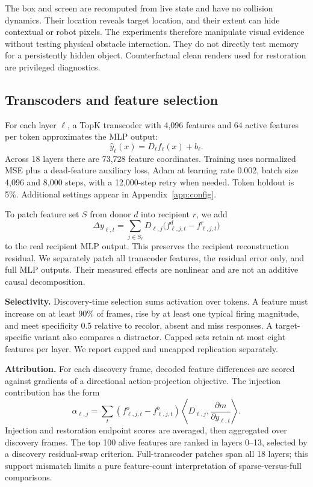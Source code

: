 \documentclass{article}
\begin{document}
The box and screen are recomputed from live state and have no collision dynamics. Their location reveals target location, and their extent can hide contextual or robot pixels. The experiments therefore manipulate visual evidence without testing physical obstacle interaction. They do not directly test memory for a persistently hidden object. Counterfactual clean renders used for restoration are privileged diagnostics.

\subsection{Transcoders and feature selection}
For each layer $\ell$, a TopK transcoder with 4,096 features and 64 active features per token approximates the MLP output:
\begin{equation}
\widehat y_\ell(x)=D_\ell f_\ell(x)+b_\ell.
\end{equation}
Across 18 layers there are 73,728 feature coordinates. Training uses normalized MSE plus a dead-feature auxiliary loss, Adam at learning rate 0.002, batch size 4,096 and 8,000 steps, with a 12,000-step retry when needed. Token holdout is 5\%. Additional settings appear in Appendix~\ref{app:config}.

To patch feature set $S$ from donor $d$ into recipient $r$, we add
\begin{equation}
\Delta y_{\ell,t}=\sum_{j\in S_\ell}D_{\ell,j}\big(f^d_{\ell,j,t}-f^r_{\ell,j,t}\big)
\end{equation}
to the real recipient MLP output. This preserves the recipient reconstruction residual. We separately patch all transcoder features, the residual error only, and full MLP outputs. Their measured effects are nonlinear and are not an additive causal decomposition.

\textbf{Selectivity.} Discovery-time selection sums activation over tokens. A feature must increase on at least 90\% of frames, rise by at least one typical firing magnitude, and meet specificity 0.5 relative to recolor, absent and miss responses. A target-specific variant also compares a distractor. Capped sets retain at most eight features per layer. We report capped and uncapped replication separately.

\textbf{Attribution.} For each discovery frame, decoded feature differences are scored against gradients of a directional action-projection objective. The injection contribution has the form
\begin{equation}
\alpha_{\ell,j}=\sum_t (f^o_{\ell,j,t}-f^b_{\ell,j,t})
\left\langle D_{\ell,j},\frac{\partial m}{\partial y_{\ell,t}}\right\rangle.
\end{equation}
Injection and restoration endpoint scores are averaged, then aggregated over discovery frames. The top 100 alive features are ranked in layers 0--13, selected by a discovery residual-swap criterion. Full-transcoder patches span all 18 layers; this support mismatch limits a pure feature-count interpretation of sparse-versus-full comparisons.
\end{document}
